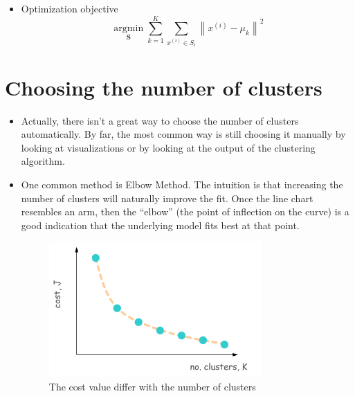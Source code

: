 \begin{itemize}
    \item Optimization objective
    \begin{equation}
        \mathop{\arg\min}\limits_{\textbf{S}} \sum_{k=1}^{K} \sum_{x^{(i)} \in S_i}\left\lVert {x^{(i)} - \mu_k} \right\rVert ^2
    \end{equation}
\end{itemize}


\section{Choosing the number of clusters}
\begin{itemize}
    \item Actually, there isn't a great way to choose the number of clusters automatically. 
    By far, the most common way is still choosing it manually by looking at visualizations or by looking at the output of the clustering algorithm.
    \item One common method is Elbow Method. The intuition is that increasing the number of clusters will naturally improve the fit.
    Once the line chart resembles an arm, then the ``elbow'' (the point of inflection on the curve) is a good indication that the underlying model fits best at that point.
    \begin{figure}[!htbp]
        \centering
        \includegraphics[width=3.2in]{./images/elbowMethod.png}
        \caption{The cost value differ with the number of clusters}
    \end{figure}
\end{itemize}
